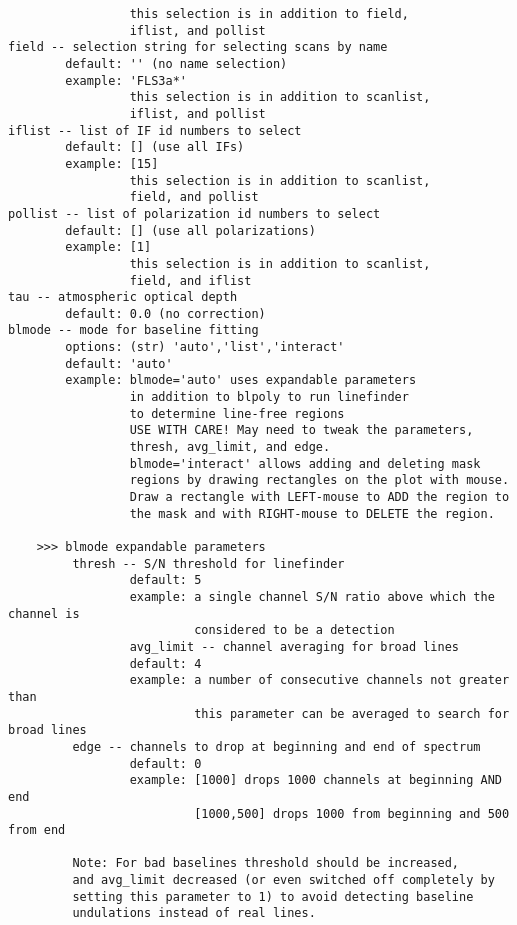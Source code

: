 \begin{verbatim}
                 this selection is in addition to field,
                 iflist, and pollist
field -- selection string for selecting scans by name
        default: '' (no name selection)
        example: 'FLS3a*'
                 this selection is in addition to scanlist,
                 iflist, and pollist
iflist -- list of IF id numbers to select
        default: [] (use all IFs)
        example: [15]
                 this selection is in addition to scanlist,
                 field, and pollist
pollist -- list of polarization id numbers to select
        default: [] (use all polarizations)
        example: [1]
                 this selection is in addition to scanlist,
                 field, and iflist
tau -- atmospheric optical depth
        default: 0.0 (no correction)
blmode -- mode for baseline fitting
        options: (str) 'auto','list','interact'
        default: 'auto'
        example: blmode='auto' uses expandable parameters 
                 in addition to blpoly to run linefinder
                 to determine line-free regions
                 USE WITH CARE! May need to tweak the parameters,
                 thresh, avg_limit, and edge.
                 blmode='interact' allows adding and deleting mask 
                 regions by drawing rectangles on the plot with mouse. 
                 Draw a rectangle with LEFT-mouse to ADD the region to 
                 the mask and with RIGHT-mouse to DELETE the region. 
       
    >>> blmode expandable parameters
         thresh -- S/N threshold for linefinder
                 default: 5
                 example: a single channel S/N ratio above which the channel is
                          considered to be a detection
                 avg_limit -- channel averaging for broad lines
                 default: 4
                 example: a number of consecutive channels not greater than
                          this parameter can be averaged to search for broad lines
         edge -- channels to drop at beginning and end of spectrum
                 default: 0
                 example: [1000] drops 1000 channels at beginning AND end
                          [1000,500] drops 1000 from beginning and 500 from end
                
         Note: For bad baselines threshold should be increased,
         and avg_limit decreased (or even switched off completely by
         setting this parameter to 1) to avoid detecting baseline
         undulations instead of real lines.


\end{verbatim}
